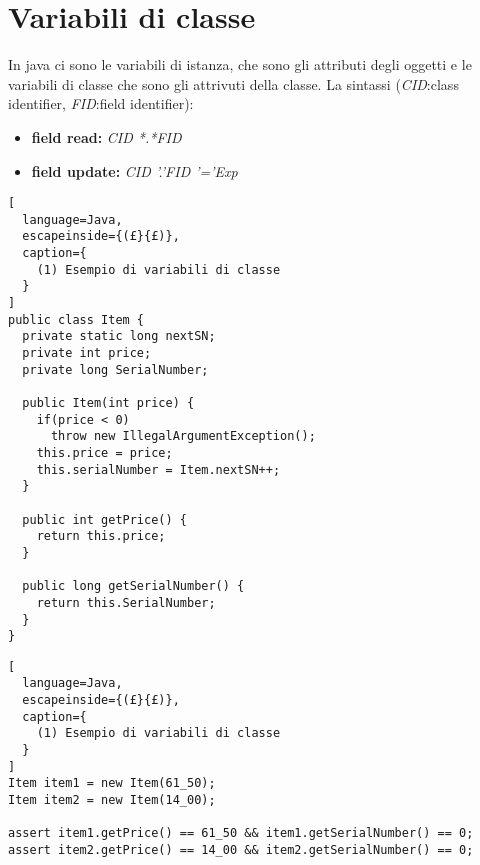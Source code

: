\section{Variabili di classe}
In java ci sono le variabili di istanza, che sono gli attributi degli oggetti e
le variabili di classe che sono gli attrivuti della classe.
La sintassi (\emph{CID}:class identifier, \emph{FID}:field identifier):
\begin{itemize}
  \item \textbf{field read:} \emph{CID *.*FID}
  \item \textbf{field update:} \emph{CID '.'FID '='Exp}
\end{itemize}
\begin{lstlisting}[
  language=Java,
  escapeinside={(£}{£)},
  caption={
    (1) Esempio di variabili di classe
  }
]
public class Item {
  private static long nextSN;
  private int price;
  private long SerialNumber;
  
  public Item(int price) {
    if(price < 0)
      throw new IllegalArgumentException();
    this.price = price;
    this.serialNumber = Item.nextSN++;
  }

  public int getPrice() {
    return this.price;
  }

  public long getSerialNumber() {
    return this.SerialNumber;
  }
}
\end{lstlisting}

\begin{lstlisting}[
  language=Java,
  escapeinside={(£}{£)},
  caption={
    (1) Esempio di variabili di classe
  }
]
Item item1 = new Item(61_50);
Item item2 = new Item(14_00);

assert item1.getPrice() == 61_50 && item1.getSerialNumber() == 0;
assert item2.getPrice() == 14_00 && item2.getSerialNumber() == 0;
\end{lstlisting}
